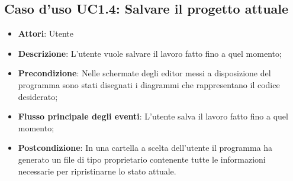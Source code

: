 \documentclass[../AnalisiDeiRequisiti.tex]{subfiles}
\begin{document}
	\subsection{Caso d'uso UC1.4: Salvare il progetto attuale}
	\begin{itemize}
		\item \textbf{Attori}: Utente
		\item \textbf{Descrizione}: L'utente vuole salvare il lavoro fatto fino a quel momento;
		\item \textbf{Precondizione}: Nelle schermate degli editor messi a disposizione del programma sono stati disegnati i diagrammi che rappresentano il codice desiderato;
		\item \textbf{Flusso principale degli eventi}: L'utente salva il lavoro fatto fino a quel momento;
		\item \textbf{Postcondizione}: In una cartella a scelta dell'utente il programma ha generato un file di tipo proprietario contenente tutte le informazioni necessarie per ripristinarne lo stato attuale.
	\end{itemize}
\end{document}
